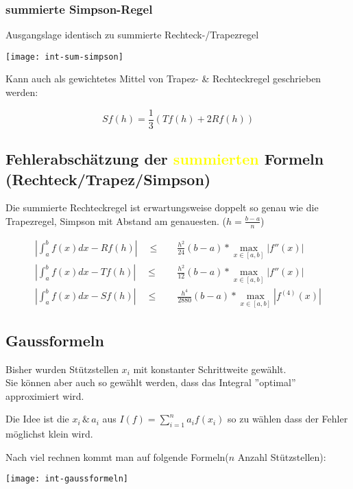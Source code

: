 \subsubsection{summierte Simpson-Regel}

Ausgangslage identisch zu summierte Rechteck-/Trapezregel

\begin{center}
	\texttt{[image: int-sum-simpson]}
\end{center}


Kann auch als gewichtetes Mittel von Trapez- \& Rechteckregel geschrieben werden:

$$Sf(h) = \frac{1}{3}(Tf(h) + 2Rf(h))$$




\subsection{Fehlerabschätzung der \textcolor{yellow}{summierten} Formeln
	(Rechteck/Trapez/Simpson)}
Die summierte Rechteckregel ist erwartungsweise doppelt so genau wie die Trapezregel,
Simpson mit Abstand am genauesten. ($h = \frac{b-a}{n}$)

{\large
		\begin{align*}
			|\int_a^b{f(x) dx} - Rf(h)| \quad \le & \quad \frac{h^2}{24} (b-a) * \max_{x \in [a, b]} |f''(x)|       \\
			|\int_a^b{f(x) dx} - Tf(h)| \quad \le & \quad \frac{h^2}{12} (b-a) * \max_{x \in [a, b]} |f''(x)|       \\
			|\int_a^b{f(x) dx} - Sf(h)| \quad \le & \quad \frac{h^4}{2880} (b-a) * \max_{x \in [a, b]} |f^{(4)}(x)|
		\end{align*}
	}




\subsection{Gaussformeln}

Bisher wurden Stützstellen $x_i$ mit konstanter Schrittweite gewählt.\\
Sie können aber auch so gewählt werden, dass das Integral ''optimal'' approximiert wird.

Die Idee ist die $x_i \, \& \, a_i$ aus $I(f) = \sum_{i=1}^n a_i f(x_i)$ so zu wählen
dass der Fehler möglichst klein wird.

Nach viel rechnen kommt man auf folgende Formeln($n$ Anzahl Stützstellen):

\texttt{[image: int-gaussformeln]}






